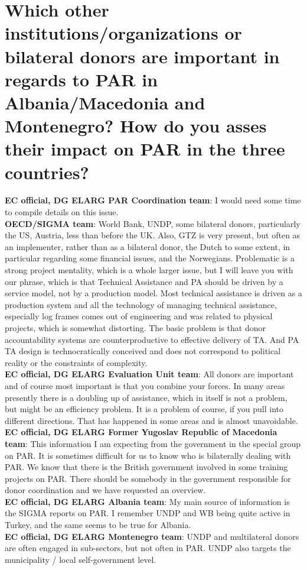 \section{Which other institutions/organizations or bilateral donors are important in regards to PAR in Albania/Macedonia and Montenegro? How do you asses their impact on PAR in the three countries?}
\label{sec:countries2}
\textbf{EC official, DG ELARG PAR Coordination team}: I would need some time to compile details on this issue. \\
\textbf{OECD/SIGMA team}: World Bank, UNDP, some bilateral donors, particularly the US, Austria, less than before the UK. Also, GTZ is very present, but often as an implementer, rather than as a bilateral donor, the Dutch to some extent, in particular regarding some financial issues, and the Norwegians. Problematic is a strong project mentality, which is a whole larger issue, but I will leave you with our phrase, which is that Technical Assistance and PA should be driven by a service model, not by a production model. Most technical assistance is driven as a production system and all the technology of managing technical assistance, especially log frames comes out of engineering and was related to physical projects, which is somewhat distorting. The basic problem is that donor accountability systems are counterproductive to effective delivery of TA. And PA TA design is technocratically conceived and does not correspond to political reality or the constraints of complexity.\\
\textbf{EC official, DG ELARG Evaluation Unit team}: All donors are important and of course most important is that you combine your forces. In many areas presently there is a doubling up of assistance, which in itself is not a problem, but might be an efficiency problem. It is a problem of course, if you pull into different directions. That has happened in some areas and is almost unavoidable. \\
\textbf{EC official, DG ELARG Former Yugoslav Republic of Macedonia team}: This information I am expecting from the government in the special group on PAR. It is sometimes difficult for us to know who is bilaterally dealing with PAR. We know that there is the British government involved in some training projects on PAR. There should be somebody in the government responsible for donor coordination and we have requested an overview. \\
\textbf{EC official, DG ELARG Albania team}: My main source of information is the SIGMA reports on PAR. I remember UNDP and WB being quite active in Turkey, and the same seems to be true for Albania.\\
\textbf{EC official, DG ELARG Montenegro team}: UNDP and multilateral donors are often engaged in sub-sectors, but not often in PAR. UNDP also targets the municipality / local self-government level.\\
